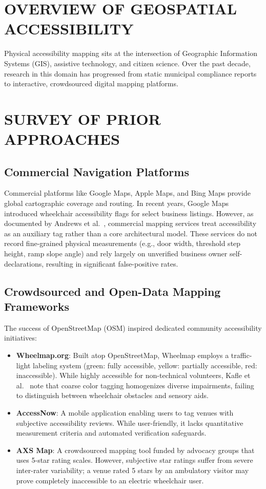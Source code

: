 \documentclass[12pt,a4paper]{report}
\begin{document}
\section{OVERVIEW OF GEOSPATIAL ACCESSIBILITY}
Physical accessibility mapping sits at the intersection of Geographic Information Systems (GIS), assistive technology, and citizen science. Over the past decade, research in this domain has progressed from static municipal compliance reports to interactive, crowdsourced digital mapping platforms.

\section{SURVEY OF PRIOR APPROACHES}

\subsection{Commercial Navigation Platforms}
Commercial platforms like Google Maps, Apple Maps, and Bing Maps provide global cartographic coverage and routing. In recent years, Google Maps introduced wheelchair accessibility flags for select business listings. However, as documented by Andrews et al.~\cite{andrews1989}, commercial mapping services treat accessibility as an auxiliary tag rather than a core architectural model. These services do not record fine-grained physical measurements (e.g., door width, threshold step height, ramp slope angle) and rely largely on unverified business owner self-declarations, resulting in significant false-positive rates.

\subsection{Crowdsourced and Open-Data Mapping Frameworks}
The success of OpenStreetMap (OSM) inspired dedicated community accessibility initiatives:
\begin{itemize}
    \item \textbf{Wheelmap.org}: Built atop OpenStreetMap, Wheelmap employs a traffic-light labeling system (green: fully accessible, yellow: partially accessible, red: inaccessible). While highly accessible for non-technical volunteers, Kafle et al.~\cite{kafle2025} note that coarse color tagging homogenizes diverse impairments, failing to distinguish between wheelchair obstacles and sensory aids.
    \item \textbf{AccessNow}: A mobile application enabling users to tag venues with subjective accessibility reviews. While user-friendly, it lacks quantitative measurement criteria and automated verification safeguards.
    \item \textbf{AXS Map}: A crowdsourced mapping tool funded by advocacy groups that uses 5-star rating scales. However, subjective star ratings suffer from severe inter-rater variability; a venue rated 5 stars by an ambulatory visitor may prove completely inaccessible to an electric wheelchair user.
\end{itemize}
\end{document}
